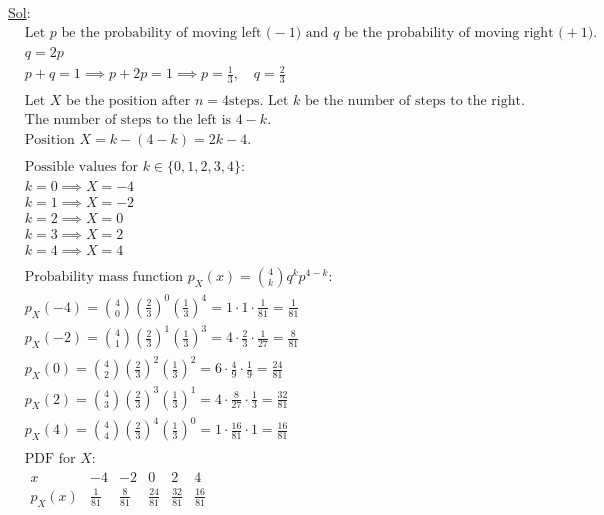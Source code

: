 \begin{enumerate}
    \underline{Sol}:\\
    $$
    \begin{aligned}
      & \text{Let } p \text{ be the probability of moving left (} -1
      \text{) and } q \text{ be the probability of moving right (} +1
      \text{).} \\
      & q = 2p \\
      & p + q = 1 \implies p + 2p = 1 \implies p = \frac{1}{3}, \quad
      q = \frac{2}{3} \\
      \\
      & \text{Let } X \text{ be the position after } n=4 \text{
      steps. Let } k \text{ be the number of steps to the right.} \\
      & \text{The number of steps to the left is } 4 - k. \\
      & \text{Position } X = k - (4 - k) = 2k - 4. \\
      \\
      & \text{Possible values for } k \in \{0, 1, 2, 3, 4\}: \\
      & k=0 \implies X = -4 \\
      & k=1 \implies X = -2 \\
      & k=2 \implies X = 0 \\
      & k=3 \implies X = 2 \\
      & k=4 \implies X = 4 \\
      \\
      & \text{Probability mass function } p_X(x) = \binom{4}{k} q^k p^{4-k}: \\
      & p_X(-4) = \binom{4}{0} \left(\frac{2}{3}\right)^0
      \left(\frac{1}{3}\right)^4 = 1 \cdot 1 \cdot \frac{1}{81} =
      \frac{1}{81} \\
      & p_X(-2) = \binom{4}{1} \left(\frac{2}{3}\right)^1
      \left(\frac{1}{3}\right)^3 = 4 \cdot \frac{2}{3} \cdot
      \frac{1}{27} = \frac{8}{81} \\
      & p_X(0) = \binom{4}{2} \left(\frac{2}{3}\right)^2
      \left(\frac{1}{3}\right)^2 = 6 \cdot \frac{4}{9} \cdot
      \frac{1}{9} = \frac{24}{81} \\
      & p_X(2) = \binom{4}{3} \left(\frac{2}{3}\right)^3
      \left(\frac{1}{3}\right)^1 = 4 \cdot \frac{8}{27} \cdot
      \frac{1}{3} = \frac{32}{81} \\
      & p_X(4) = \binom{4}{4} \left(\frac{2}{3}\right)^4
      \left(\frac{1}{3}\right)^0 = 1 \cdot \frac{16}{81} \cdot 1 =
      \frac{16}{81} \\
      \\
      & \text{PDF for } X: \\
      &
      \begin{array}{c|ccccc}
        x & -4 & -2 & 0 & 2 & 4 \\
        \hline
        p_X(x) & \frac{1}{81} & \frac{8}{81} & \frac{24}{81} &
        \frac{32}{81} & \frac{16}{81} \\
      \end{array}
    \end{aligned}$$


\end{enumerate}
